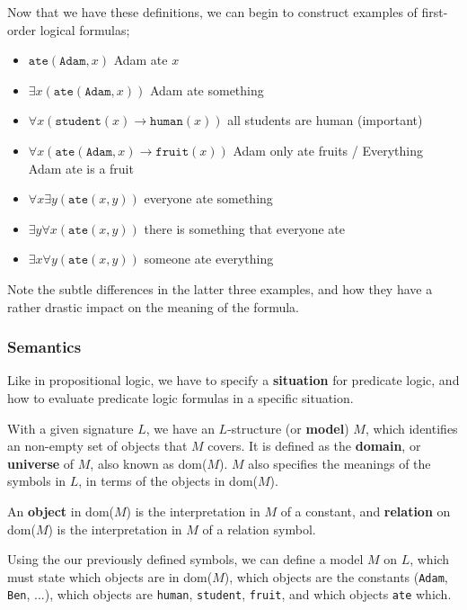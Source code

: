 \documentclass[a4paper, 12pt]{article}
\begin{document}
                Now that we have these definitions, we can begin to construct examples of first-order logical formulas;
                \begin{itemize}
                    \itemsep0em
                    \item $\texttt{ate}(\texttt{Adam}, x)$ \hfill Adam ate $x$
                    \item $\exists x (\texttt{ate}(\texttt{Adam}, x))$ \hfill Adam ate something
                    \item $\forall x (\texttt{student}(x) \rightarrow \texttt{human}(x))$ \hfill all students are human (important)
                    \item $\forall x (\texttt{ate}(\texttt{Adam}, x) \rightarrow \texttt{fruit}(x))$ \hfill Adam only ate fruits / Everything Adam ate is a fruit
                    \item $\forall x \exists y (\texttt{ate}(x, y))$ \hfill everyone ate something
                    \item $\exists y \forall x (\texttt{ate}(x, y))$ \hfill there is something that everyone ate
                    \item $\exists x \forall y (\texttt{ate}(x, y))$ \hfill someone ate everything
                \end{itemize}
                Note the subtle differences in the latter three examples, and how they have a rather drastic impact on the meaning of the formula.
            \subsubsection*{Semantics}
                Like in propositional logic, we have to specify a \textbf{situation} for predicate logic, and how to evaluate predicate logic formulas in a specific situation.
                \medskip

                With a given signature $L$, we have an $L$-structure (or \textbf{model}) $M$, which identifies an non-empty set of objects that $M$ covers. It is defined as the \textbf{domain}, or \textbf{universe} of $M$, also known as dom($M$). $M$ also specifies the meanings of the symbols in $L$, in terms of the objects in dom($M$).
                \smallskip

                An \textbf{object} in dom($M$) is the interpretation in $M$ of a constant, and \textbf{relation} on dom($M$) is the interpretation in $M$ of a relation symbol.
                \medskip

                Using the our previously defined symbols, we can define a model $M$ on $L$, which must state which objects are in dom($M$), which objects are the constants (\texttt{Adam}, \texttt{Ben}, ...), which objects are \texttt{human}, \texttt{student}, \texttt{fruit}, and which objects \texttt{ate} which.
\end{document}
